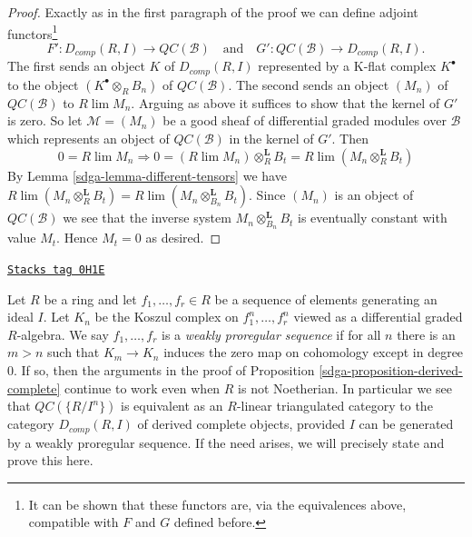 \begin{proof}
\medskip\noindent
Exactly as in the first paragraph of the proof we can define
adjoint functors\footnote{It can be shown that these functors are,
via the equivalences above, compatible with $F$ and $G$ defined before.}
$$
F' : D_{comp}(R, I) \longrightarrow \mathit{QC}(\mathcal{B})
\quad\text{and}\quad
G' : \mathit{QC}(\mathcal{B}) \longrightarrow D_{comp}(R, I).
$$
The first sends an object $K$ of $D_{comp}(R, I)$ represented by a
K-flat complex $K^\bullet$ to the object $(K^\bullet \otimes_R B_n)$
of $\mathit{QC}(\mathcal{B})$. The second sends an object
$(M_n)$ of $\mathit{QC}(\mathcal{B})$ to $R\lim M_n$.
Arguing as above it suffices to show that the kernel of $G'$ is zero.
So let $\mathcal{M} = (M_n)$ be a good sheaf of differential graded
modules over $\mathcal{B}$ which represents an object of
$\mathit{QC}(\mathcal{B})$ in the kernel of $G'$. Then
$$
0 = R\lim M_n \Rightarrow
0 = (R\lim M_n) \otimes_R^\mathbf{L} B_t =
R\lim (M_n \otimes_R^\mathbf{L} B_t)
$$
By Lemma \ref{sdga-lemma-different-tensors} we have
$R\lim (M_n \otimes_R^\mathbf{L} B_t) =
R\lim (M_n \otimes_{B_n}^\mathbf{L} B_t)$.
Since $(M_n)$ is an object of $\mathit{QC}(\mathcal{B})$ we
see that the inverse system $M_n \otimes_{B_n}^\mathbf{L} B_t$
is eventually constant with value $M_t$. Hence $M_t = 0$ as desired.
\end{proof}

\begin{remark}[Proregular]
\label{sdga-remark-proregular}
\href{https://stacks.math.columbia.edu/tag/0H1E}{\texttt{Stacks tag 0H1E}}

Let $R$ be a ring and let $f_1, \ldots, f_r \in R$ be a sequence of elements
generating an ideal $I$. Let $K_n$ be the Koszul complex on
$f_1^n, \ldots, f_r^n$ viewed as a differential graded $R$-algebra.
We say $f_1, \ldots, f_r$ is a {\it weakly proregular sequence}
if for all $n$ there is an $m > n$ such that $K_m \to K_n$
induces the zero map on cohomology except in degree $0$. If so, then
the arguments in the proof of Proposition \ref{sdga-proposition-derived-complete}
continue to work even when $R$ is not Noetherian.
In particular we see that $\mathit{QC}(\{R/I^n\})$
is equivalent as an $R$-linear triangulated category
to the category $D_{comp}(R, I)$ of derived complete objects, provided
$I$ can be generated by a weakly proregular sequence.
If the need arises, we will precisely state and prove this here.
\end{remark}



